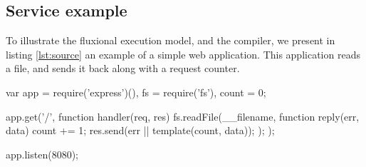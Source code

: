 

\subsection{Service example}

To illustrate the fluxional execution model, and the compiler, we present in listing \ref{lst:source} an example of a simple web application.
This application reads a file, and sends it back along with a request counter.

\begin{code}[js,
  caption={Example web application},
  label={lst:source}]
var app = require('express')(),
    fs = require('fs'),
    count = 0;

app.get('/', function handler(req, res){
  fs.readFile(__filename, function reply(err, data) {
    count += 1;
    res.send(err || template(count, data));
  });
});

app.listen(8080);
\end{code}

